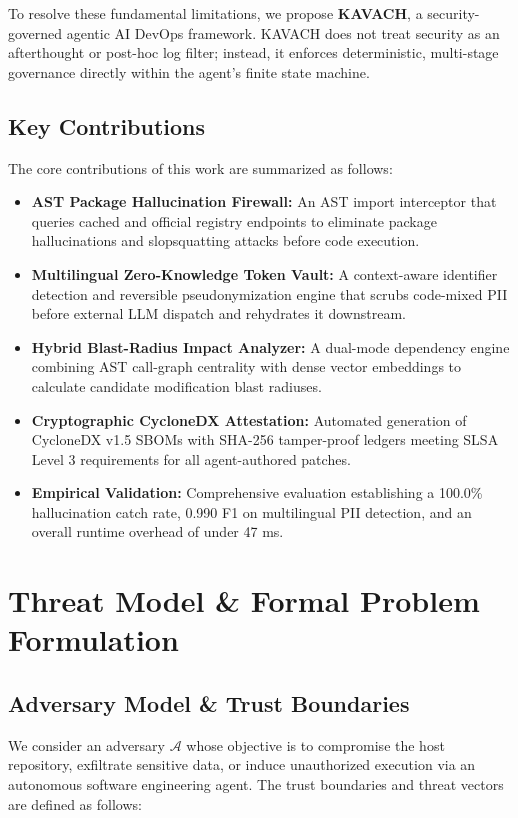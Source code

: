 \documentclass[conference]{IEEEtran}
\begin{document}
To resolve these fundamental limitations, we propose \textbf{KAVACH}, a security-governed agentic AI DevOps framework. KAVACH does not treat security as an afterthought or post-hoc log filter; instead, it enforces deterministic, multi-stage governance directly within the agent's finite state machine.

\subsection{Key Contributions}
The core contributions of this work are summarized as follows:
\begin{itemize}
    \item \textbf{AST Package Hallucination Firewall:} An AST import interceptor that queries cached and official registry endpoints to eliminate package hallucinations and slopsquatting attacks before code execution.
    \item \textbf{Multilingual Zero-Knowledge Token Vault:} A context-aware identifier detection and reversible pseudonymization engine that scrubs code-mixed PII before external LLM dispatch and rehydrates it downstream.
    \item \textbf{Hybrid Blast-Radius Impact Analyzer:} A dual-mode dependency engine combining AST call-graph centrality with dense vector embeddings to calculate candidate modification blast radiuses.
    \item \textbf{Cryptographic CycloneDX Attestation:} Automated generation of CycloneDX v1.5 SBOMs with SHA-256 tamper-proof ledgers meeting SLSA Level 3 requirements for all agent-authored patches.
    \item \textbf{Empirical Validation:} Comprehensive evaluation establishing a 100.0\% hallucination catch rate, 0.990 F1 on multilingual PII detection, and an overall runtime overhead of under 47 ms.
\end{itemize}

\section{Threat Model \& Formal Problem Formulation}

\subsection{Adversary Model \& Trust Boundaries}
We consider an adversary $\mathcal{A}$ whose objective is to compromise the host repository, exfiltrate sensitive data, or induce unauthorized execution via an autonomous software engineering agent. The trust boundaries and threat vectors are defined as follows:
\end{document}
